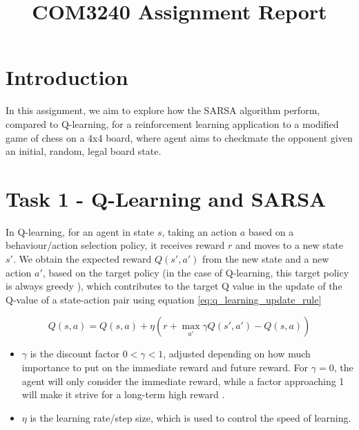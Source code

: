 \documentclass[conference]{IEEEtran}
\begin{document}
\title{COM3240 Assignment Report}

\author{
}

\maketitle

\section{Introduction}
In this assignment, we aim to explore how the SARSA algorithm perform, compared to Q-learning, for a reinforcement learning application to a modified game of chess on a 4x4 board, where agent aims to checkmate the opponent given an initial, random, legal board state.

\section{Task 1 - Q-Learning and SARSA}
In Q-learning, for an agent in state $s$, taking an action $a$ based on a behaviour/action selection policy, it receives reward $r$ and moves to a new state $s'$. We obtain the expected reward $Q(s',a')$ from the new state and a new action $a'$, based on the target policy (in the case of Q-learning, this target policy is always greedy \cite{sarsa yt}), which contributes to the target Q value in the update of the Q-value of a state-action pair using equation \ref{eq:q_learning_update_rule}

\begin{equation}
    Q(s,a) = Q(s,a) + \eta(r + \max_{a'}\gamma Q(s',a') - Q(s,a))
    \label{eq:q_learning_update_rule}
\end{equation}

\begin{itemize}
    \item $\gamma$ is the discount factor $0 < \gamma < 1$, adjusted depending on how much importance to put on the immediate reward and future reward. For $\gamma = 0$, the agent will only consider the immediate reward, while a factor approaching 1 will make it strive for a long-term high reward \cite{sarsa}.
    \item $\eta$ is the learning rate/step size, which is used to control the speed of learning.
\end{itemize}
\end{document}
